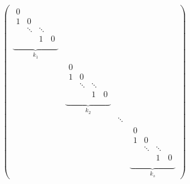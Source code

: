 \[
\begin{pmatrix}
	\underbrace{\begin{matrix}
			0&&& \\ 1&0&& \\ &\ddots&\ddots& \\ &&1&0 \\
	\end{matrix}}_{k_1} &&&
	\\
	& \underbrace{\begin{matrix}
			0&&& \\ 1&0&& \\ &\ddots&\ddots& \\ &&1&0 \\
	\end{matrix}}_{k_2} &&
	\\
	&&\ddots&
	\\
	&&& \underbrace{\begin{matrix}
			0&&& \\ 1&0&& \\ &\ddots&\ddots& \\ &&1&0 \\
	\end{matrix}}_{k_s}
\end{pmatrix}
\]